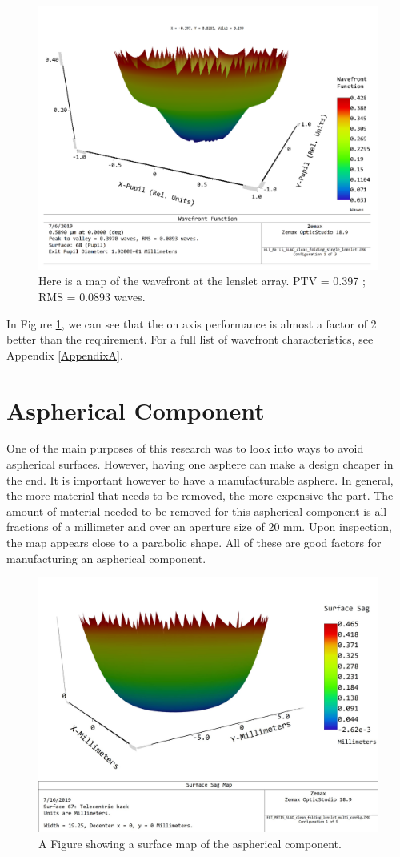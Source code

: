 \begin{figure}[h!]
\centering
\includegraphics[width=14 cm]{Figures/Results/wavefront.png}
\caption{Here is a map of the wavefront at the lenslet array.  PTV = 0.397 ; RMS = 0.0893 waves.}
\label{fig:wavefront}
\end{figure}

In Figure \ref{fig:wavefront}, we can see that the on axis performance is almost a 
factor of 2 better than the requirement.  For a full list of wavefront
characteristics, see Appendix \ref{AppendixA}.

\section{Aspherical Component}
\label{sec:asphere}

One of the main purposes of this research was to look into ways to avoid aspherical
surfaces.  However, having one asphere can make a design cheaper in the end.  It is
important however to have a manufacturable asphere.  In general, the more material
that needs to be removed, the more expensive the part.  The amount of material needed to be removed for this aspherical component is all fractions of a millimeter
and over an aperture size of 20 mm.  Upon inspection, the map appears close to a
parabolic shape.  All of these are good factors for manufacturing an aspherical
component.

\begin{figure}[h!]
\centering
\includegraphics[width=14 cm]{Figures/SurfaceSag.jpg}
\caption{A Figure showing a surface map of the aspherical component.}
\label{fig:surface_sag}
\end{figure}